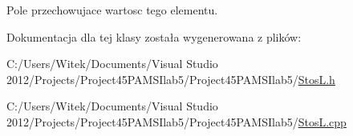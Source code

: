 Pole przechowujace wartosc tego elementu. 



Dokumentacja dla tej klasy została wygenerowana z plików\-:\begin{DoxyCompactItemize}
\item 
C\-:/\-Users/\-Witek/\-Documents/\-Visual Studio 2012/\-Projects/\-Project45\-P\-A\-M\-S\-Ilab5/\-Project45\-P\-A\-M\-S\-Ilab5/\hyperlink{_stos_l_8h}{Stos\-L.\-h}\item 
C\-:/\-Users/\-Witek/\-Documents/\-Visual Studio 2012/\-Projects/\-Project45\-P\-A\-M\-S\-Ilab5/\-Project45\-P\-A\-M\-S\-Ilab5/\hyperlink{_stos_l_8cpp}{Stos\-L.\-cpp}\end{DoxyCompactItemize}
